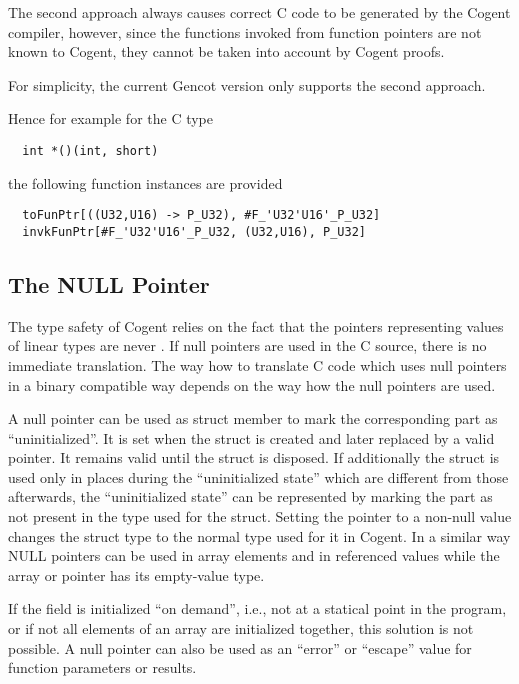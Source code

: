 The second approach always causes correct C code to be generated by the Cogent compiler, however, since the functions
invoked from function pointers are not known to Cogent, they cannot be taken into account by Cogent proofs.

For simplicity, the current Gencot version only supports the second approach.

Hence for example for the C type
\begin{verbatim}
  int *()(int, short)
\end{verbatim}
the following function instances are provided
\begin{verbatim}
  toFunPtr[((U32,U16) -> P_U32), #F_'U32'U16'_P_U32]
  invkFunPtr[#F_'U32'U16'_P_U32, (U32,U16), P_U32]
\end{verbatim}

\subsection{The NULL Pointer}
\label{design-operations-null}

The type safety of Cogent relies on the fact that the pointers representing values of linear types are never .
If null pointers are used in the C source, there is no immediate translation. The way how to translate C code which uses 
null pointers in a binary compatible way depends on the way how the null pointers are used.

A null pointer can be used as struct member  to mark the corresponding part as ``uninitialized''. 
It is set when the struct is created and later
replaced by a valid pointer. It remains valid until the struct is disposed. If additionally the struct is used only in places
during the ``uninitialized state'' which are different from those afterwards, the ``uninitialized state'' can be represented
by marking the part  as not present in the type used for the struct. Setting the pointer to a non-null value 
changes the struct type to the normal type used for it in Cogent. In a similar way NULL pointers can be used in array
elements and in referenced values while the array or pointer has its empty-value type.

If the field  is initialized ``on demand'', i.e., not at a statical point in the program, or if not all elements
of an array are initialized together, this solution is not possible.
A null pointer can also be used as an ``error'' or ``escape'' value for function parameters or results. 

